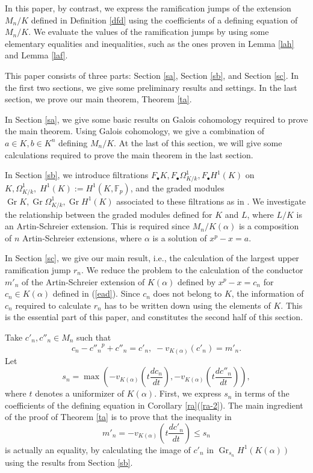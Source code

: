 \documentclass[sn-mathphys-num]{sn-jnl}
\numberwithin{equation}{section}
\newcommand{\Gr}{\operatorname{Gr}}
\theoremstyle{plain}
\theoremstyle{definition}
\begin{document}
In this paper, by contrast, we express the ramification jumps of the extension $M_n/K$ defined in Definition \ref{dfd} using the coefficients of a defining equation of $M_n/K$. We evaluate the values of the ramification jumps by using some elementary equalities and inequalities, such as the ones proven in Lemma \ref{lah} and Lemma \ref{laf}.

This paper consists of three parts: Section \ref{sa}, Section \ref{sb}, and Section \ref{sc}. In the first two sections, we give some preliminary results and settings. In the last section, we prove our main theorem, Theorem \ref{ta}.

In Section \ref{sa}, we give some basic results on Galois cohomology required to prove the main theorem.
Using Galois cohomology, we give a combination of $a\in K,b\in K^n$ defining $M_n/K$. At the last of this section, we will give some calculations required to prove the main theorem in the last section. %

In Section \ref{sb}, we introduce filtrations $F_\bullet K,F_\bullet \Omega_{K/k}^1,F_\bullet H^1(K)$ on $K,\Omega_{K/k}^1,\;H^1(K):=H^1(K,\mathbb{F}_p)$, and the graded modules $\Gr K,\Gr \Omega_{K/k}^1,\Gr H^1(K)$ associated to these filtrations as in \cite{AS}. We investigate the relationship between the graded modules defined for $K$ and $L$, where $L/K$ is an Artin-Schreier extension. This is required since $M_n/K(\alpha)$ is a composition of $n$ Artin-Schreier extensions, where $\alpha$ is a solution of $x^p-x=a$.


In Section \ref{sc}, we give our main result, i.e., the calculation of the largest upper ramification jump $r_n$. We reduce the problem to the calculation of the conductor $m'_n$ of the Artin-Schreier extension of $K(\alpha)$ defined by $x^p-x=c_n$ for $c_n\in K(\alpha)$ defined in (\ref{ead}). Since $c_n$ does not belong to $K$, the information of $c_n$ required to calculate $r_n$ has to be written down using the elements of $K$. This is the essential part of this paper, and constitutes the second half of this section.

Take $c'_n,c''_n\in M_n$ such that
\begin{equation}
c_n-{c''_n}^p+c''_n=c'_n,\; -v_{K(\alpha)}(c'_n)=m'_n.
\end{equation}
Let
\begin{equation}
s_n=\max\left(-v_{K(\alpha)}\left(t\frac{dc_n}{dt}\right),-v_{K(\alpha)}\left(t\frac{dc''_n}{dt}\right)\right),
\end{equation}
where $t$ denotes a uniformizer of $K(\alpha)$. First, we express $s_n$ in terms of the coefficients of the defining equation in Corollary \ref{ra}(\ref{ra-2}). The main ingredient of the proof of Theorem \ref{ta} is to prove that the inequality in
\begin{equation}
m'_n=-v_{K(\alpha)}\left(t\frac{dc'_n}{dt}\right)\leq s_n
\end{equation}
is actually an equality, by calculating the image of $c'_n$ in $\Gr_{s_n}H^1(K(\alpha))$ using the results from Section \ref{sb}. 
\end{document}
